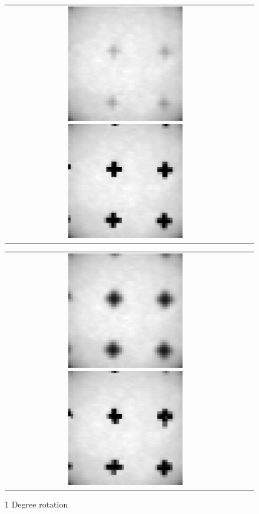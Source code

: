 \documentclass[iop]{emulateapj}
\begin{document}
\begin{figure}
        \begin{tabular}{cc}
            \includegraphics[width=0.5\textwidth]{rot_1_1}
            \includegraphics[width=0.5\textwidth]{rot_1_2}
        \end{tabular}
        \begin{tabular}{cc}
            \includegraphics[width=0.5\textwidth]{rot_1_3}
            \includegraphics[width=0.5\textwidth]{rot_1_4}
        \end{tabular}
        \caption{1 Degree rotation}
\end{figure}
\end{document}
